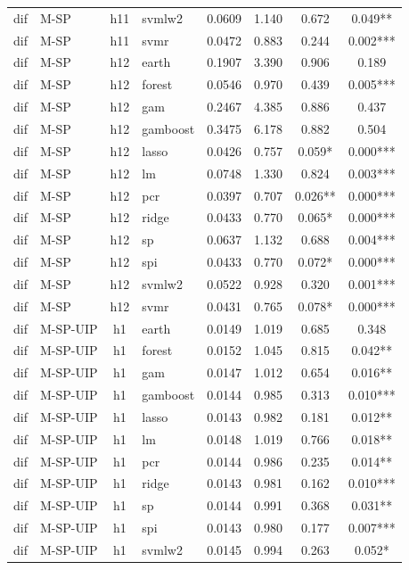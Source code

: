 \begin{ThreePartTable}
\begin{longtable}[t]{llclcccc}
dif & M-SP & h11 & svmlw2 & 0.0609 & 1.140 & 0.672 & 0.049**\\
dif & M-SP & h11 & svmr & 0.0472 & 0.883 & 0.244 & 0.002***\\
\addlinespace
dif & M-SP & h12 & earth & 0.1907 & 3.390 & 0.906 & 0.189\\
dif & M-SP & h12 & forest & 0.0546 & 0.970 & 0.439 & 0.005***\\
dif & M-SP & h12 & gam & 0.2467 & 4.385 & 0.886 & 0.437\\
dif & M-SP & h12 & gamboost & 0.3475 & 6.178 & 0.882 & 0.504\\
dif & M-SP & h12 & lasso & 0.0426 & 0.757 & 0.059* & 0.000***\\
dif & M-SP & h12 & lm & 0.0748 & 1.330 & 0.824 & 0.003***\\
dif & M-SP & h12 & pcr & 0.0397 & 0.707 & 0.026** & 0.000***\\
dif & M-SP & h12 & ridge & 0.0433 & 0.770 & 0.065* & 0.000***\\
dif & M-SP & h12 & sp & 0.0637 & 1.132 & 0.688 & 0.004***\\
dif & M-SP & h12 & spi & 0.0433 & 0.770 & 0.072* & 0.000***\\
dif & M-SP & h12 & svmlw2 & 0.0522 & 0.928 & 0.320 & 0.001***\\
dif & M-SP & h12 & svmr & 0.0431 & 0.765 & 0.078* & 0.000***\\
\addlinespace
dif & M-SP-UIP & h1 & earth & 0.0149 & 1.019 & 0.685 & 0.348\\
dif & M-SP-UIP & h1 & forest & 0.0152 & 1.045 & 0.815 & 0.042**\\
dif & M-SP-UIP & h1 & gam & 0.0147 & 1.012 & 0.654 & 0.016**\\
dif & M-SP-UIP & h1 & gamboost & 0.0144 & 0.985 & 0.313 & 0.010***\\
dif & M-SP-UIP & h1 & lasso & 0.0143 & 0.982 & 0.181 & 0.012**\\
dif & M-SP-UIP & h1 & lm & 0.0148 & 1.019 & 0.766 & 0.018**\\
dif & M-SP-UIP & h1 & pcr & 0.0144 & 0.986 & 0.235 & 0.014**\\
dif & M-SP-UIP & h1 & ridge & 0.0143 & 0.981 & 0.162 & 0.010***\\
dif & M-SP-UIP & h1 & sp & 0.0144 & 0.991 & 0.368 & 0.031**\\
dif & M-SP-UIP & h1 & spi & 0.0143 & 0.980 & 0.177 & 0.007***\\
dif & M-SP-UIP & h1 & svmlw2 & 0.0145 & 0.994 & 0.263 & 0.052*\\

\end{longtable}
\end{ThreePartTable}
